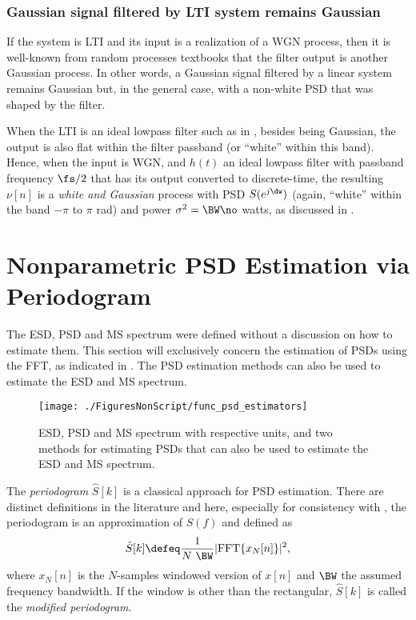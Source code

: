 \subsubsection{Gaussian signal filtered by LTI system remains Gaussian}

If the system is LTI and its input is a realization of a WGN process, then it is well-known from random processes textbooks that the filter output is another Gaussian process. In other words, a Gaussian signal filtered by a linear system remains Gaussian but, in the general case, with a non-white PSD that was shaped by the filter.

When the LTI is an ideal lowpass filter such as in , besides being Gaussian, the output is also flat within the filter passband (or ``white'' within this band). 
Hence, when the input is WGN, and $h(t)$ an ideal lowpass filter with passband frequency $\fs/2$ that has its output converted to discrete-time,  the resulting $\nu[n]$ is a \emph{white and Gaussian} process with PSD $S(e^{j \dw})$ (again, ``white'' within the band $-\pi$ to $\pi$ rad) and power $\sigma^2=\BW \no$ watts, as discussed in . 

\section{Nonparametric PSD Estimation via Periodogram}
\label{sec:nonparametric_psd_est}
The ESD, PSD and MS spectrum were defined without a discussion on how to estimate them. This section will exclusively concern the estimation of PSDs using the FFT, as indicated in . The PSD estimation methods
can also be used to estimate the ESD and MS spectrum.

\begin{figure}[htbp]
\centering
\texttt{[image: ./FiguresNonScript/func\_psd\_estimators]}
\caption{ESD, PSD and MS spectrum with respective units, and two methods for estimating PSDs that
can also be used to estimate the ESD and MS spectrum.\label{fig:func_psd_estimators}}
\end{figure}

The \emph{periodogram} $\hat S[k]$ is a classical approach for PSD estimation. There are distinct definitions in the literature and here, especially for consistency with {\matlab}, the periodogram is an approximation of $S(f)$ and defined as
\begin{equation}
\hat S[k] \defeq \frac{1}{N \textrm{~} \BW} |\textrm{FFT} \{ x_N[n] \}|^2,
\label{eq:periodogram_discretetime2}
\end{equation}
where $x_N[n]$ is the $N$-samples windowed version of $x[n]$ and $\BW$ the assumed frequency bandwidth. If the window is other than the rectangular, $\hat S[k]$ is called the \emph{modified periodogram}.

